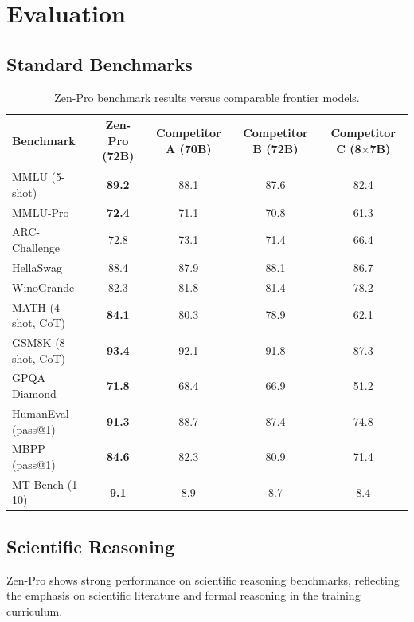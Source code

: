 \documentclass[11pt,a4paper]{article}
\begin{document}
\section{Evaluation}

\subsection{Standard Benchmarks}

\begin{table}[H]
\centering
\caption{Zen-Pro benchmark results versus comparable frontier models.}
\label{tab:benchmarks}
\begin{tabular}{lcccc}
\toprule
\textbf{Benchmark} & \textbf{Zen-Pro (72B)} & \textbf{Competitor A (70B)} & \textbf{Competitor B (72B)} & \textbf{Competitor C (8$\times$7B)} \\
\midrule
MMLU (5-shot)          & \textbf{89.2} & 88.1 & 87.6 & 82.4 \\
MMLU-Pro               & \textbf{72.4} & 71.1 & 70.8 & 61.3 \\
ARC-Challenge          & 72.8 & 73.1 & 71.4 & 66.4 \\
HellaSwag              & 88.4 & 87.9 & 88.1 & 86.7 \\
WinoGrande             & 82.3 & 81.8 & 81.4 & 78.2 \\
\midrule
MATH (4-shot, CoT)     & \textbf{84.1} & 80.3 & 78.9 & 62.1 \\
GSM8K (8-shot, CoT)    & \textbf{93.4} & 92.1 & 91.8 & 87.3 \\
GPQA Diamond           & \textbf{71.8} & 68.4 & 66.9 & 51.2 \\
\midrule
HumanEval (pass@1)     & \textbf{91.3} & 88.7 & 87.4 & 74.8 \\
MBPP (pass@1)          & \textbf{84.6} & 82.3 & 80.9 & 71.4 \\
\midrule
MT-Bench (1-10)        & \textbf{9.1}  &  8.9 &  8.7 &  8.4 \\
\bottomrule
\end{tabular}
\end{table}

\subsection{Scientific Reasoning}

Zen-Pro shows strong performance on scientific reasoning benchmarks, reflecting the emphasis on
scientific literature and formal reasoning in the training curriculum.
\end{document}
